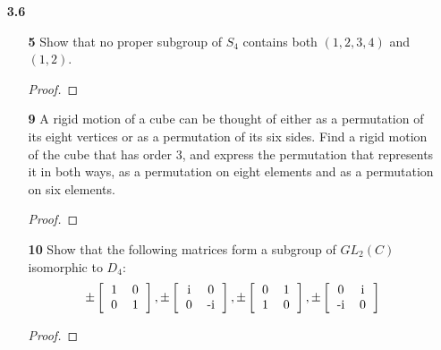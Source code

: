 \documentclass[paper=usletter, fontsize=12pt]{article}
\begin{document}

    \begin{itemize}

        \item[\textbf{3.6}]
        \begin{itemize}

            \item[\textbf{5}] Show that no proper subgroup of $S_4$ contains
            both $(1, 2, 3, 4)$ and $(1, 2)$.
            \begin{proof}
            \end{proof}

            \item[\textbf{9}] A rigid motion of a cube can be thought of either
            as a permutation of its eight vertices or as a permutation of its
            six sides. Find a rigid motion of the cube that has order 3, and
            express the permutation that represents it in both ways, as a
            permutation on eight elements and as a permutation on six elements.
            \begin{proof}
            \end{proof}

            \item[\textbf{10}] Show that the following matrices form a subgroup
            of $GL_2(C)$ isomorphic to $D_4$:
            \begin{equation*}
                \pm\left[\begin{tabular}{cc}
                            1 & 0 \\
                            0 & 1
                \end{tabular}\right],
                \pm\left[\begin{tabular}{cc}
                            i & 0 \\
                            0 & -i
                \end{tabular}\right],
                \pm\left[\begin{tabular}{cc}
                            0 & 1 \\
                            1 & 0
                \end{tabular}\right],
                \pm\left[\begin{tabular}{cc}
                            0 & i \\
                            -i & 0
                \end{tabular}\right]
            \end{equation*}
            \begin{proof}
            \end{proof}


\end{itemize}
\end{itemize}
\end{document}
